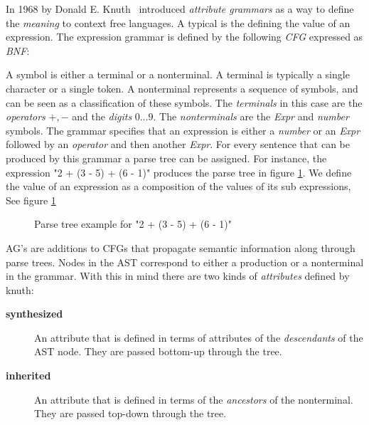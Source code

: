 \documentclass[twoside, titlepage, openright, a4paper]{book}
\newcommand{\ags}{\emph{attribute grammars }}
\begin{document}
In 1968 by Donald E. Knuth~\cite{knuth1} introduced \ags as a way to define the \emph{meaning} to context free languages. A typical is the defining the value of an expression. The expression grammar is defined by the following \emph{CFG} expressed as \emph{BNF}:



A symbol is either a terminal or a nonterminal. A terminal is typically a single character or a single token. A nonterminal represents a sequence of symbols, and can be seen as a classification of these symbols.
The \emph{terminals} in this case are the \emph{operators} $+,-$ and the \emph{digits} $0\ldots 9$. The \emph{nonterminals} are the \emph{Expr} and \emph{number} symbols. The grammar specifies that an expression is either a \emph{number} or an \emph{Expr} followed by an \emph{operator} and then another \emph{Expr}. For every sentence that can be produced by this grammar a parse tree can be assigned. For instance, the expression "2 + (3 - 5) + (6 - 1)" produces the parse tree in figure \ref{fig.example1.parsetree}. We define the value of an expression as a composition of the values of its sub expressions, See figure \ref{fig.example1.parsetree}

\begin{figure}[H]
\centering
{}
\caption{Parse tree example for "2 + (3 - 5) + (6 - 1)"}
\label{fig.example1.parsetree}
\end{figure}

AG's are additions to CFGs that propagate semantic information along through parse trees. Nodes in the AST correspond to either a production or a nonterminal in the grammar. With this in mind there are two kinds of \emph{attributes} defined by knuth\cite{knuth1}:
\begin{description}
\item[\textbf{synthesized}] An attribute that is defined in terms of attributes of the \emph{descendants} of the AST node. They are passed bottom-up through the tree.
\item[\textbf{inherited}] An attribute that is defined in terms of the \emph{ancestors} of the nonterminal. They are passed top-down through the tree.
\end{description}
\end{document}

